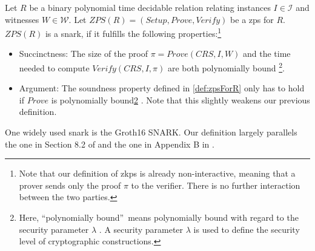 \begin{definition}
    Let $R$ be a binary polynomial time decidable relation relating instances $I\in\mathcal{I}$ and witnesses $W\in\mathcal{W}$.
    Let $ZPS(R)=(Setup, Prove, Verify)$ be a \gls{zps} for $R$.
    $ZPS(R)$ is a \gls{snark}, if it fulfills the following properties:\footnote{\label{footnote:NonInteractiveness}
        Note that our definition of \glspl{zkp} is already non-interactive, meaning that a prover sends only the proof $\pi$ to the verifier.
        There is no further interaction between the two parties.
    }
    \begin{itemize}
        \item Succinctness: The size of the proof $\pi=Prove(CRS, I, W)$ and the time needed to compute $Verify(CRS, I, \pi)$ are both polynomially bound \footnote{
            \label{footnote:securityParameterSuccinctness}
            Here, ``polynomially bound''\ means polynomially bound with regard to the security parameter $\lambda$ \cite{groth_size_2016}.
            A security parameter $\lambda$ is used to define the security level of cryptographic constructions.
        }\cite{groth_size_2016}.
        \item Argument: The soundness property defined in \cref{def:zpsForR} only has to hold if $Prove$ is polynomially bound\cref{footnote:securityParameterSuccinctness} \cite{least_authority_moonmath_2024}.
        Note that this slightly weakens our previous definition.
    \end{itemize}
\end{definition}

One widely used \gls{snark} is the Groth16 SNARK. 
Our definition largely parallels the one in Section 8.2 of \cite{least_authority_moonmath_2024} and the one in Appendix B in \cite{huber_zk-snarks_2025}.

